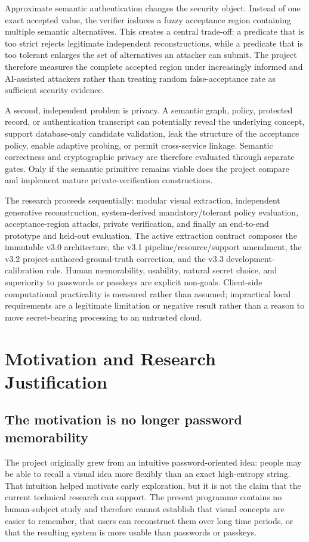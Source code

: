 \documentclass[11pt,a4paper]{article}
\begin{document}
Approximate semantic authentication changes the security object. Instead of one exact accepted value, the verifier induces a fuzzy acceptance region containing multiple semantic alternatives. This creates a central trade-off: a predicate that is too strict rejects legitimate independent reconstructions, while a predicate that is too tolerant enlarges the set of alternatives an attacker can submit. The project therefore measures the complete accepted region under increasingly informed and AI-assisted attackers rather than treating random false-acceptance rate as sufficient security evidence.

A second, independent problem is privacy. A semantic graph, policy, protected record, or authentication transcript can potentially reveal the underlying concept, support database-only candidate validation, leak the structure of the acceptance policy, enable adaptive probing, or permit cross-service linkage. Semantic correctness and cryptographic privacy are therefore evaluated through separate gates. Only if the semantic primitive remains viable does the project compare and implement mature private-verification constructions.

The research proceeds sequentially: modular visual extraction, independent generative reconstruction, system-derived mandatory/tolerant policy evaluation, acceptance-region attacks, private verification, and finally an end-to-end prototype and held-out evaluation. The active extraction contract composes the immutable v3.0 architecture, the v3.1 pipeline/resource/support amendment, the v3.2 project-authored-ground-truth correction, and the v3.3 development-calibration rule. Human memorability, usability, natural secret choice, and superiority to passwords or passkeys are explicit non-goals. Client-side computational practicality is measured rather than assumed; impractical local requirements are a legitimate limitation or negative result rather than a reason to move secret-bearing processing to an untrusted cloud.

\section{Motivation and Research Justification}

\subsection{The motivation is no longer password memorability}

The project originally grew from an intuitive password-oriented idea: people may be able to recall a visual idea more flexibly than an exact high-entropy string. That intuition helped motivate early exploration, but it is not the claim that the current technical research can support. The present programme contains no human-subject study and therefore cannot establish that visual concepts are easier to remember, that users can reconstruct them over long time periods, or that the resulting system is more usable than passwords or passkeys.
\end{document}
